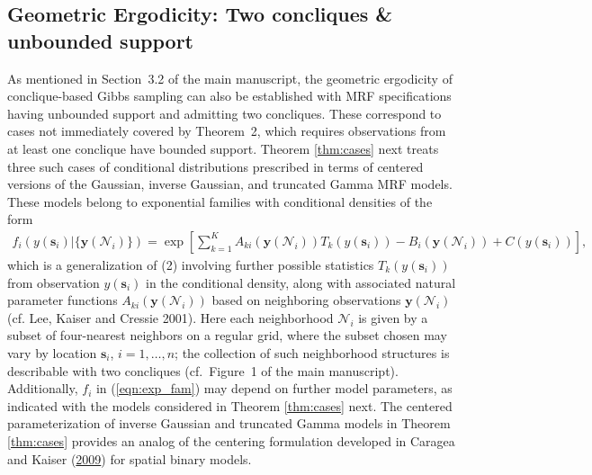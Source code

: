 \documentclass[12pt]{article}
\theoremstyle{definition}
\begin{document}
\subsection{Geometric Ergodicity: Two concliques \& unbounded support}
As mentioned in Section~3.2 of the main manuscript, the geometric ergodicity of  conclique-based Gibbs
sampling   can also be established with
MRF specifications having unbounded support and admitting two concliques. These correspond to cases not immediately covered by
Theorem~2, which requires observations from at least one conclique have  bounded support.  
Theorem \ref{thm:cases} next treats three
such cases of conditional distributions prescribed in terms of centered versions
of the Gaussian, inverse Gaussian, and truncated Gamma MRF models.
 These
models belong to exponential families  with conditional densities of the
form
\begin{align}
f_i(y(\boldsymbol s_i)|\{\boldsymbol y(\mathcal{N}_i)\}) = \exp\left[\sum\limits_{k = 1}^K A_{ki}(\boldsymbol y(\mathcal{N}_i)) T_k(y(\boldsymbol s_i)) - B_i(\boldsymbol y(\mathcal{N}_i)) + C(y(\boldsymbol s_i)) \right], \label{eqn:exp_fam}
\end{align}
which is a generalization of (2) involving further possible
statistics \(T_k(y(\boldsymbol s_i))\) from observation
\(y(\boldsymbol s_i)\)   in the conditional density,  along with associated
natural parameter functions \(A_{ki}(\boldsymbol y(\mathcal{N}_i))\)
based on neighboring observations \(\boldsymbol y(\mathcal{N}_i)\) (cf.
Lee,  Kaiser  and   Cressie  2001).  Here each neighborhood $\mathcal{N}_i$ is given by a subset of four-nearest neighbors on a regular grid, where the subset chosen may vary by location $\boldsymbol s_i$, $i=1,\ldots,n$; the collection of such neighborhood structures is describable with two concliques (cf.~Figure~1 of the main manuscript).
Additionally, \(f_i\) in (\ref{eqn:exp_fam}) may depend on further model
parameters, as indicated with the models considered in Theorem \ref{thm:cases}
next.  The centered parameterization of inverse Gaussian and truncated Gamma
models in Theorem \ref{thm:cases} provides an analog of the centering
formulation developed in Caragea and Kaiser
(\protect\hyperlink{ref-caragea2009autologistic}{2009}) for spatial
binary models.

\setcounter{theorem}{2}
\end{document}
